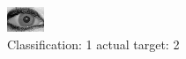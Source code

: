 \begin{figure}[h!]
\begin{center}
\includegraphics[width=0.60\columnwidth]{figures/ID1983_class_1_target_2.png}
\end{center}
\caption{ Classification: 1 actual target: 2}
\label{fig:ID1983_class_1_target_2}
\end{figure}
